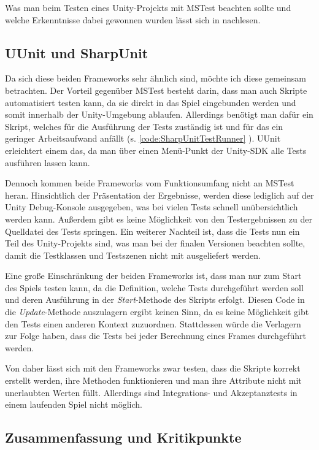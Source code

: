 Was man beim Testen eines Unity-Projekts mit MSTest beachten sollte und welche Erkenntnisse dabei gewonnen wurden lässt sich in \cite{TDGD13} nachlesen.

\subsection{UUnit und SharpUnit}

Da sich diese beiden Frameworks sehr ähnlich sind, möchte ich diese gemeinsam betrachten. Der Vorteil gegenüber MSTest besteht darin, dass man auch Skripte automatisiert testen kann, da sie direkt in das Spiel eingebunden werden und somit innerhalb der Unity-Umgebung ablaufen. Allerdings benötigt man dafür ein Skript, welches für die Ausführung der Tests zuständig ist und für das ein geringer Arbeitsaufwand anfällt (s. \autoref{code:SharpUnitTestRunner} ). UUnit erleichtert einem das, da man über einen Menü-Punkt der Unity-SDK alle Tests ausführen lassen kann.

Dennoch kommen beide Frameworks vom Funktionsumfang nicht an MSTest heran. Hinsichtlich der Präsentation der Ergebnisse, werden diese lediglich auf der Unity Debug-Konsole ausgegeben, was bei vielen Tests schnell unübersichtlich werden kann. Außerdem gibt es keine Möglichkeit von den Testergebnissen zu der Quelldatei des Tests springen. Ein weiterer Nachteil ist, dass die Tests nun ein Teil des Unity-Projekts sind, was man bei der finalen Versionen beachten sollte, damit die Testklassen und Testszenen nicht mit ausgeliefert werden.

Eine große Einschränkung der beiden Frameworks ist, dass man nur zum Start des Spiels testen kann, da die Definition, welche Tests durchgeführt werden soll und deren Ausführung in der \textit{Start}-Methode des Skripts erfolgt. Diesen Code in die \textit{Update}-Methode auszulagern ergibt keinen Sinn, da es keine Möglichkeit gibt den Tests einen anderen Kontext zuzuordnen. Stattdessen würde die Verlagern zur Folge haben, dass die Tests bei jeder Berechnung eines Frames durchgeführt werden.

Von daher lässt sich mit den Frameworks zwar testen, dass die Skripte korrekt erstellt werden, ihre Methoden funktionieren und man ihre Attribute nicht mit unerlaubten Werten füllt. Allerdings sind Integrations- und Akzeptanztests in einem laufenden Spiel nicht möglich.

\subsection{Zusammenfassung und Kritikpunkte}

